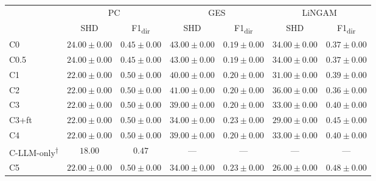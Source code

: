 \begin{tabular}{l|cc|cc|cc}
\hline
 & \multicolumn{2}{c|}{PC} & \multicolumn{2}{c|}{GES} & \multicolumn{2}{c}{LiNGAM} \\
 & SHD & F1\textsubscript{dir} & SHD & F1\textsubscript{dir} & SHD & F1\textsubscript{dir} \\
\hline
C0 & $24.00 \pm 0.00$ & $0.45 \pm 0.00$ & $43.00 \pm 0.00$ & $0.19 \pm 0.00$ & $34.00 \pm 0.00$ & $0.37 \pm 0.00$ \\
C0.5 & $24.00 \pm 0.00$ & $0.45 \pm 0.00$ & $43.00 \pm 0.00$ & $0.19 \pm 0.00$ & $34.00 \pm 0.00$ & $0.37 \pm 0.00$ \\
C1 & $22.00 \pm 0.00$ & $0.50 \pm 0.00$ & $40.00 \pm 0.00$ & $0.20 \pm 0.00$ & $31.00 \pm 0.00$ & $0.39 \pm 0.00$ \\
C2 & $22.00 \pm 0.00$ & $0.50 \pm 0.00$ & $41.00 \pm 0.00$ & $0.20 \pm 0.00$ & $36.00 \pm 0.00$ & $0.36 \pm 0.00$ \\
C3 & $22.00 \pm 0.00$ & $0.50 \pm 0.00$ & $39.00 \pm 0.00$ & $0.20 \pm 0.00$ & $33.00 \pm 0.00$ & $0.40 \pm 0.00$ \\
C3+ft & $22.00 \pm 0.00$ & $0.50 \pm 0.00$ & $34.00 \pm 0.00$ & $0.23 \pm 0.00$ & $29.00 \pm 0.00$ & $0.45 \pm 0.00$ \\
C4 & $22.00 \pm 0.00$ & $0.50 \pm 0.00$ & $39.00 \pm 0.00$ & $0.20 \pm 0.00$ & $33.00 \pm 0.00$ & $0.40 \pm 0.00$ \\
C-LLM-only\textsuperscript{$\dagger$} & $18.00$ & $0.47$ & --- & --- & --- & --- \\ %
C5 & $22.00 \pm 0.00$ & $0.50 \pm 0.00$ & $34.00 \pm 0.00$ & $0.23 \pm 0.00$ & $26.00 \pm 0.00$ & $0.48 \pm 0.00$ \\
\hline
\end{tabular}

